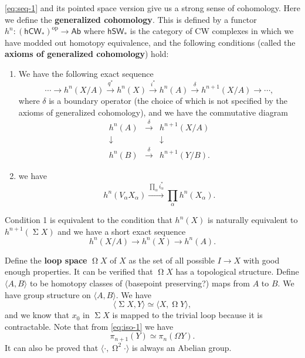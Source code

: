 \documentclass[hyperref, a4paper]{article}
\newcommand*{\concept}[1]{{\textbf{#1}}}
\DeclareMathOperator{\sigmasus}{\Sigma}
\DeclareMathOperator{\loopspace}{\Omega}
\begin{document}
\eqref{eq:seq-1} and its pointed space version give us a strong sense of cohomology. 
Here we define the \concept{generalized cohomology}. 
This is defined by a functor $h^n : (\mathsf{hCW}_*)^\text{op} \to \mathsf{Ab}$ where $\mathsf{hSW}_*$ is the category of CW 
complexes in which we have modded out homotopy equivalence, and the following conditions
(called the \concept{axioms of generalized cohomology}) hold:
\begin{enumerate}
    \item We have the following exact sequence 
    \begin{equation}
        \cdots \to h^n(X / A) \stackrel{q^*}{\to} h^n(X) \stackrel{i^*}{\to} h^n(A) \stackrel{\delta}{\to} h^{n+1}(X / A) \to \cdots,
    \end{equation}
    where $\delta$ is a boundary operator (the choice of which is not specified by the axioms of generalized cohomology),
    and we have the commutative diagram 
    \begin{equation}
        \begin{matrix}
            h^n(A) & \stackrel{\delta}{\to} & h^{n+1}(X / A) \\
            \downarrow & & \downarrow \\
            h^n(B) & \stackrel{\delta}{\to} & h^{n+1}(Y / B).
        \end{matrix}
    \end{equation}
    \item we have 
    \begin{equation}
        h^n(V_\alpha X_\alpha) \stackrel{\prod_\alpha i^*_\alpha}{\longrightarrow} \prod_\alpha h^n(X_\alpha). 
    \end{equation}
\end{enumerate}

Condition 1 is equivalent to the condition that $h^n(X)$ is naturally equivalent to $h^{n+1}(\sigmasus X)$ and we have a 
short exact sequence
\begin{equation}
    h^n(X / A) \to h^n(X) \to h^n(A).
\end{equation}

Define the \concept{loop space} $\loopspace X$ of $X$ as the set of all possible $I \to X$ with good enough properties.
It can be verified that $\loopspace X$ has a topological structure.
Define $\langle A, B \rangle$ to be homotopy classes of (basepoint preserving?) maps from $A$ to $B$.
We have group structure on $\langle A, B \rangle$.
We have 
\begin{equation}
    \langle \sigmasus X, Y \rangle \simeq \langle X, \loopspace Y \rangle,
    \label{eq:iso-1}
\end{equation}
and we know that $x_0$ in $\sigmasus X$ is mapped to the trivial loop because it is contractable.
Note that from \eqref{eq:iso-1} we have 
\begin{equation}
    \pi_{n+1}(Y) \simeq \pi_n(\Omega Y).
\end{equation}
It can also be proved that $\langle \cdot, \loopspace^2 \cdot \rangle$ is always an Abelian group.
\end{document}
